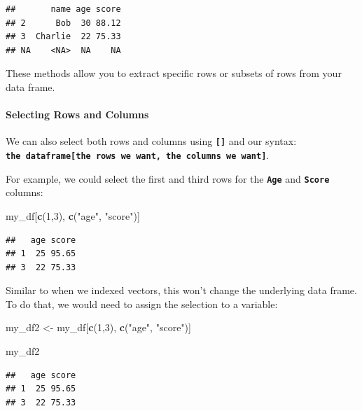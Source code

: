 \documentclass[
]{book}
\newenvironment{Shaded}{\begin{snugshade}}{\end{snugshade}}
\newcommand{\DecValTok}[1]{\textcolor[rgb]{0.00,0.00,0.81}{#1}}
\newcommand{\FunctionTok}[1]{\textcolor[rgb]{0.13,0.29,0.53}{\textbf{#1}}}
\newcommand{\NormalTok}[1]{#1}
\newcommand{\OtherTok}[1]{\textcolor[rgb]{0.56,0.35,0.01}{#1}}
\newcommand{\StringTok}[1]{\textcolor[rgb]{0.31,0.60,0.02}{#1}}
\begin{document}
\begin{verbatim}
##       name age score
## 2      Bob  30 88.12
## 3  Charlie  22 75.33
## NA    <NA>  NA    NA
\end{verbatim}

These methods allow you to extract specific rows or subsets of rows from your data frame.

\paragraph{Selecting Rows and Columns}\label{selecting-rows-and-columns}

We can also select both rows and columns using \textbf{\texttt{{[}{]}}} and our syntax: \textbf{\texttt{the\ dataframe{[}the\ rows\ we\ want,\ the\ columns\ we\ want{]}}}.

For example, we could select the first and third rows for the \textbf{\texttt{Age}} and \textbf{\texttt{Score}} columns:

\begin{Shaded}
\begin{Highlighting}[]
\NormalTok{my\_df[}\FunctionTok{c}\NormalTok{(}\DecValTok{1}\NormalTok{,}\DecValTok{3}\NormalTok{), }\FunctionTok{c}\NormalTok{(}\StringTok{"age"}\NormalTok{, }\StringTok{"score"}\NormalTok{)]}
\end{Highlighting}
\end{Shaded}

\begin{verbatim}
##   age score
## 1  25 95.65
## 3  22 75.33
\end{verbatim}

Similar to when we indexed vectors, this won't change the underlying data frame. To do that, we would need to assign the selection to a variable:

\begin{Shaded}
\begin{Highlighting}[]
\NormalTok{my\_df2 }\OtherTok{\textless{}{-}}\NormalTok{ my\_df[}\FunctionTok{c}\NormalTok{(}\DecValTok{1}\NormalTok{,}\DecValTok{3}\NormalTok{), }\FunctionTok{c}\NormalTok{(}\StringTok{"age"}\NormalTok{, }\StringTok{"score"}\NormalTok{)]}

\NormalTok{my\_df2}
\end{Highlighting}
\end{Shaded}

\begin{verbatim}
##   age score
## 1  25 95.65
## 3  22 75.33
\end{verbatim}
\end{document}
